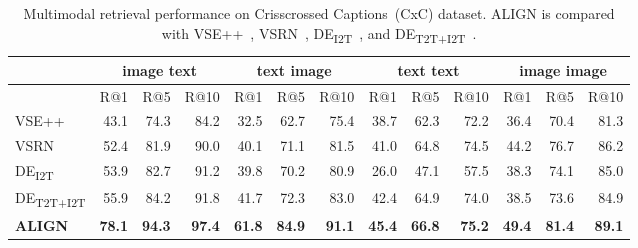 \documentclass{article}
\begin{document}
\begin{table*}[t]
\begin{center}
\caption{Multimodal retrieval performance on Crisscrossed Captions~(CxC) dataset. ALIGN is compared with VSE++~\cite{faghri:vse++}, VSRN~\cite{li:vsrn}, DE\textsubscript{I2T}~\cite{parekh:cxc}, and DE\textsubscript{T2T+I2T}~\cite{parekh:cxc}.}
\label{tab:cxc_results}
\vspace{2mm}
\begin{small}
\begin{tabular}{l|rrr|rrr|rrr|rrr}
\toprule
& \multicolumn{3}{c|}{image  text} & \multicolumn{3}{c|}{text  image} & \multicolumn{3}{c|}{text  text} & \multicolumn{3}{c}{image  image} \\
\midrule
& R@1 & R@5 & R@10 & R@1 & R@5 & R@10 & R@1 & R@5 & R@10 & R@1 & R@5 & R@10 \\
VSE++                     & 43.1 & 74.3 & 84.2 & 32.5 & 62.7 & 75.4 & 38.7 & 62.3 & 72.2 & 36.4 & 70.4 & 81.3 \\
VSRN                      & 52.4 & 81.9 & 90.0 & 40.1 & 71.1 & 81.5 & 41.0 & 64.8 & 74.5 & 44.2 & 76.7 & 86.2 \\ 
DE\textsubscript{I2T}     & 53.9 & 82.7 & 91.2 & 39.8 & 70.2 & 80.9 & 26.0 & 47.1 & 57.5 & 38.3 & 74.1 & 85.0 \\
DE\textsubscript{T2T+I2T} & 55.9 & 84.2 & 91.8 & 41.7 & 72.3 & 83.0 & 42.4 & 64.9 & 74.0 & 38.5 & 73.6 & 84.9 \\
\textbf{ALIGN}            & \textbf{78.1} & \textbf{94.3} & \textbf{97.4} & \textbf{61.8} & \textbf{84.9} & \textbf{91.1} & \textbf{45.4} & \textbf{66.8} & \textbf{75.2} & \textbf{49.4} & \textbf{81.4} & \textbf{89.1} \\
\bottomrule
\end{tabular}
\end{small}
\end{center}
\vspace{-5mm}
\end{table*}
\end{document}

